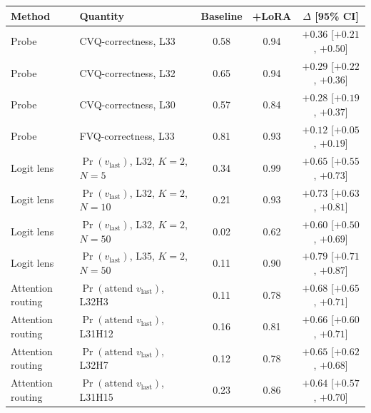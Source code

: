 \begin{tabular}{llccc}
\toprule
\textbf{Method} & \textbf{Quantity} & \textbf{Baseline} & \textbf{+LoRA} & \textbf{$\Delta$ [95\% CI]} \\
\midrule
Probe & CVQ-correctness, L33 & 0.58 & 0.94 & $+0.36$ [$+0.21$, $+0.50$] \\
Probe & CVQ-correctness, L32 & 0.65 & 0.94 & $+0.29$ [$+0.22$, $+0.36$] \\
Probe & CVQ-correctness, L30 & 0.57 & 0.84 & $+0.28$ [$+0.19$, $+0.37$] \\
Probe & FVQ-correctness, L33 & 0.81 & 0.93 & $+0.12$ [$+0.05$, $+0.19$] \\
\midrule
Logit lens & $\Pr(v_{\text{last}})$, L32, $K{=}2$, $N{=}5$  & 0.34 & 0.99 & $+0.65$ [$+0.55$, $+0.73$] \\
Logit lens & $\Pr(v_{\text{last}})$, L32, $K{=}2$, $N{=}10$ & 0.21 & 0.93 & $+0.73$ [$+0.63$, $+0.81$] \\
Logit lens & $\Pr(v_{\text{last}})$, L32, $K{=}2$, $N{=}50$ & 0.02 & 0.62 & $+0.60$ [$+0.50$, $+0.69$] \\
Logit lens & $\Pr(v_{\text{last}})$, L35, $K{=}2$, $N{=}50$ & 0.11 & 0.90 & $+0.79$ [$+0.71$, $+0.87$] \\
\midrule
Attention routing & $\Pr(\text{attend } v_{\text{last}})$, L32H3  & 0.11 & 0.78 & $+0.68$ [$+0.65$, $+0.71$] \\
Attention routing & $\Pr(\text{attend } v_{\text{last}})$, L31H12 & 0.16 & 0.81 & $+0.66$ [$+0.60$, $+0.71$] \\
Attention routing & $\Pr(\text{attend } v_{\text{last}})$, L32H7  & 0.12 & 0.78 & $+0.65$ [$+0.62$, $+0.68$] \\
Attention routing & $\Pr(\text{attend } v_{\text{last}})$, L31H15 & 0.23 & 0.86 & $+0.64$ [$+0.57$, $+0.70$] \\
\bottomrule
\end{tabular}
